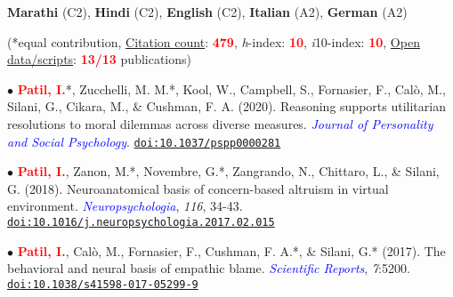 \documentclass[10pt]{article}
\begin{document}
	

	\textbf{Marathi} (C2), \textbf{Hindi} (C2), \textbf{English} (C2), \textbf{Italian} (A2), \textbf{German} (A2)
	
	\begin{center}
	(*equal contribution, \href{https://scholar.google.it/citations?user=kSYuYTUAAAAJ&hl=en&oi=ao}{Citation count}: \textbf{\textcolor{red}{479}}, \textit{h}-index: \textbf{\textcolor{red}{10}}, \textit{i}10-index: \textbf{\textcolor{red}{10}}, \href{https://osf.io/hk5f3/}{Open data/scripts}: \textbf{\textcolor{red}{13/13}} publications)\\
	\end{center}

	$\bullet$ \textbf{\textcolor{red}{Patil, I.}}*, Zucchelli, M. M.*, Kool, W., Campbell, S., Fornasier, F., Cal\`{o}, M., Silani, G., Cikara, M., \& \hspace*{0.1in}Cushman, F. A. (2020). Reasoning supports utilitarian resolutions to moral dilemmas across diverse \hspace*{0.1in}measures. \textit{\textcolor{blue}{Journal of Personality and Social Psychology}}. \href{https://psyarxiv.com/q86vx/}{\tt doi:10.1037/pspp0000281}
	\miniskip
	
	$\bullet$ \textbf{\textcolor{red}{Patil, I.}}, Zanon, M.*, Novembre, G.*, Zangrando, N., Chittaro, L., \& Silani, G. (2018). Neuroanatomical \hspace*{0.1in}basis of concern-based altruism in virtual environment. \textit{\textcolor{blue}{Neuropsychologia}}, \textit{116}, 34-43. \hspace*{0.1in}\href{https://drive.google.com/open?id=0B6_u70YpdJKnWU0zblpBOUMxRXc}{\tt doi:10.1016/j.neuropsychologia.2017.02.015}
	\miniskip	
	
	$\bullet$ \textbf{\textcolor{red}{Patil, I.}}, Cal\`{o}, M., Fornasier, F., Cushman, F. A.*, \& Silani, G.* (2017). The behavioral and neural basis of \hspace*{0.1in}empathic blame. 
	\textit{\textcolor{blue}{Scientific Reports}}, \textit{7}:5200. \href{https://drive.google.com/open?id=0B6_u70YpdJKnT1J6dkk5R1NPZDg}{\tt doi:10.1038/s41598-017-05299-9}
	\miniskip
	
\end{document}
